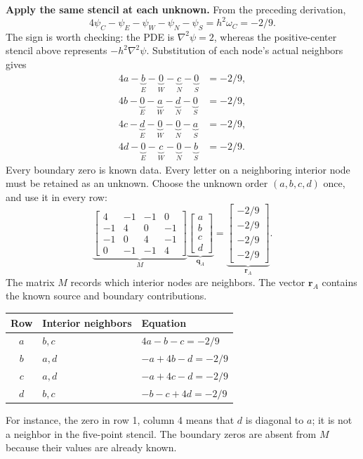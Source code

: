 \textbf{Apply the same stencil at each unknown.} From the preceding derivation,
\[
4\psi_C-\psi_E-\psi_W-\psi_N-\psi_S=h^2\omega_C=-2/9.
\]
The sign is worth checking: the PDE is $\nabla^2\psi=2$, whereas the
positive-center stencil above represents $-h^2\nabla^2\psi$.
Substitution of each node's actual neighbors gives
\begin{align*}
4a-\underbrace{b}_{E}-\underbrace{0}_{W}-\underbrace{c}_{N}-\underbrace{0}_{S}&=-2/9,\\
4b-\underbrace{0}_{E}-\underbrace{a}_{W}-\underbrace{d}_{N}-\underbrace{0}_{S}&=-2/9,\\
4c-\underbrace{d}_{E}-\underbrace{0}_{W}-\underbrace{0}_{N}-\underbrace{a}_{S}&=-2/9,\\
4d-\underbrace{0}_{E}-\underbrace{c}_{W}-\underbrace{0}_{N}-\underbrace{b}_{S}&=-2/9.
\end{align*}
Every boundary zero is known data. Every letter on a neighboring interior node
must be retained as an unknown.
\newpage
{}
Choose the unknown order $(a,b,c,d)$ once, and use it in every row:
\[
\underbrace{\begin{bmatrix}
4&-1&-1&0\\-1&4&0&-1\\-1&0&4&-1\\0&-1&-1&4
\end{bmatrix}}_{M}
\underbrace{\begin{bmatrix}a\\b\\c\\d\end{bmatrix}}_{\boldsymbol q_A}
=\underbrace{\begin{bmatrix}-2/9\\-2/9\\-2/9\\-2/9\end{bmatrix}}_{\boldsymbol r_A}.
\]
The matrix $M$ records which interior nodes are neighbors. The vector
$\boldsymbol r_A$ contains the known source and boundary contributions.


\begin{center}\begin{tabular}{cll}\toprule
Row & Interior neighbors & Equation\\\midrule
$a$ & $b,c$ & $4a-b-c=-2/9$\\
$b$ & $a,d$ & $-a+4b-d=-2/9$\\
$c$ & $a,d$ & $-a+4c-d=-2/9$\\
$d$ & $b,c$ & $-b-c+4d=-2/9$\\\bottomrule
\end{tabular}\end{center}
For instance, the zero in row 1, column 4 means that $d$ is diagonal to $a$;
it is not a neighbor in the five-point stencil. The boundary zeros are absent
from $M$ because their values are already known.


